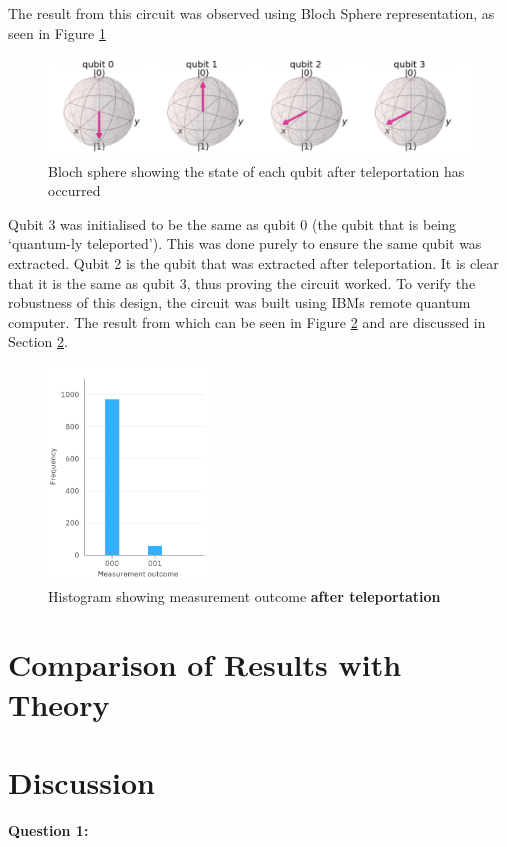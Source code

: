 The result from this circuit was observed using Bloch Sphere representation, as seen in Figure \ref{fig:teleportBloch}
\begin{figure}[h]
    \centering
    \includegraphics[width=\textwidth]{lab3/images/teleportBloch.png}
    \caption{Bloch sphere showing the state of each qubit after teleportation has occurred}
    \label{fig:teleportBloch}
\end{figure}

Qubit 3 was initialised to be the same as qubit 0 (the qubit that is being `quantum-ly teleported'). This was done purely to ensure the same qubit was extracted. Qubit 2 is the qubit that was extracted after teleportation. It is clear that it is the same as qubit 3, thus proving the circuit worked. To verify the robustness of this design, the circuit was built using IBMs remote quantum computer. The result from which can be seen in Figure \ref{fig:ibmTeleport} and are discussed in Section \ref{sec:discussTeleport}.
\begin{figure}[h]
    \centering
    \includegraphics[width=0.38\textwidth]{lab3/images/ibmTeleport.png}
    \caption{Histogram showing measurement outcome \textbf{after teleportation}}
    \label{fig:ibmTeleport}
\end{figure}

\section{Comparison of Results with Theory}
\section{Discussion} \label{sec:discussTeleport}
\textbf{Question 1:}


